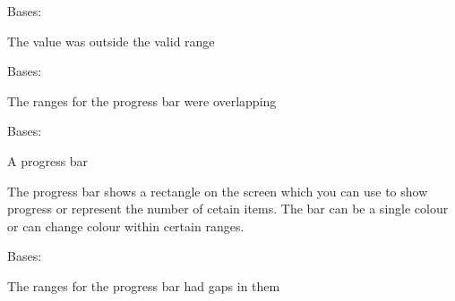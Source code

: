 \documentclass[letterpaper,10pt,english]{sphinxmanual}
\begin{document}

\begin{fulllineitems}
\label{blocks:serge.blocks.visualblocks.OutOfRange}
Bases: 

The value was outside the valid range

\end{fulllineitems}


\begin{fulllineitems}
\label{blocks:serge.blocks.visualblocks.OverlappingRanges}
Bases: 

The ranges for the progress bar were overlapping

\end{fulllineitems}


\begin{fulllineitems}
\label{blocks:serge.blocks.visualblocks.ProgressBar}
Bases: {\hyperref[visual:serge.visual.SurfaceDrawing]{}}

A progress bar

The progress bar shows a rectangle on the screen which you can
use to show progress or represent the number of cetain items.
The bar can be a single colour or can change colour within
certain ranges.

\begin{fulllineitems}
\label{blocks:serge.blocks.visualblocks.ProgressBar.value}
\end{fulllineitems}


\end{fulllineitems}


\begin{fulllineitems}
\label{blocks:serge.blocks.visualblocks.RangesNotContiguous}
Bases: 

The ranges for the progress bar had gaps in them

\end{fulllineitems}
\end{document}

